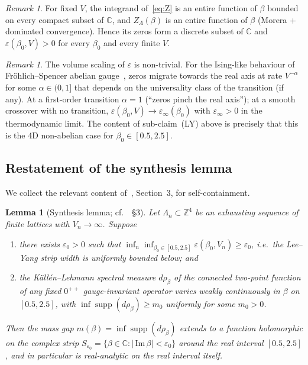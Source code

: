 \documentclass[11pt,a4paper]{article}
\newtheorem{lemma}[theorem]{Lemma}
\theoremstyle{definition}
\theoremstyle{remark}
\newtheorem{remark}[theorem]{Remark}
\DeclareMathOperator{\supp}{supp}
\newcommand{\Z}{\mathbb{Z}}
\newcommand{\C}{\mathbb{C}}
\newcommand{\sgnIm}{\,\mathrm{Im}\,}
\begin{document}
\begin{remark}
For fixed $V$, the integrand of~\eqref{eq:Z} is an entire function
of $\beta$ bounded on every compact subset of $\C$, and
$Z_\Lambda(\beta)$ is an entire function of $\beta$ (Morera +
dominated convergence). Hence its zeros form a discrete subset of
$\C$ and $\varepsilon(\beta_0, V) > 0$ for every $\beta_0$ and
every finite $V$.
\end{remark}

\begin{remark}\label{rem:Vscaling}
The volume scaling of $\varepsilon$ is non-trivial. For the
Ising-like behaviour of Fr\"ohlich--Spencer
abelian gauge~\cite{FroehlichSpencer1982}, zeros migrate towards
the real axis at rate $V^{-\alpha}$ for some
$\alpha \in (0, 1]$ that depends on the universality class of the
transition (if any). At a first-order transition $\alpha = 1$
(``zeros pinch the real axis''); at a smooth crossover with no
transition, $\varepsilon(\beta_0, V) \to \varepsilon_\infty(\beta_0)$
with $\varepsilon_\infty > 0$ in the thermodynamic limit. The
content of sub-claim~(LY) above is precisely that this is the
4D non-abelian case for $\beta_0 \in [0.5, 2.5]$.
\end{remark}

\subsection{Restatement of the synthesis lemma}

We collect the relevant content of~\cite{W2analyticite2026}, Section~3,
for self-containment.

\begin{lemma}[Synthesis lemma; cf.~\cite{W2analyticite2026}~\S3]
\label{lem:synthesis}
Let $\Lambda_n \subset \Z^4$ be an exhausting sequence of finite
lattices with $V_n \to \infty$. Suppose
\begin{enumerate}
\item[(\emph{LY})] there exists $\varepsilon_0 > 0$ such that
$\inf_{n}\inf_{\beta_0 \in [0.5, 2.5]}
\varepsilon(\beta_0, V_n) \ge \varepsilon_0$, i.e.\ the Lee--Yang
strip width is uniformly bounded below; and
\item[(\emph{SC})] the K\"all\'en--Lehmann spectral measure
$d\rho_\beta$ of the connected two-point function of any fixed
$0^{++}$ gauge-invariant operator varies weakly continuously in
$\beta$ on $[0.5, 2.5]$, with $\inf \supp(d\rho_\beta) \ge m_0$
uniformly for some $m_0 > 0$.
\end{enumerate}
Then the mass gap $m(\beta) = \inf \supp(d\rho_\beta)$ extends to
a function holomorphic on the complex strip
$S_{\varepsilon_0} = \{\beta \in \C : |\sgnIm \beta| < \varepsilon_0\}$
around the real interval $[0.5, 2.5]$, and in particular is
real-analytic on the real interval itself.
\end{lemma}
\end{document}
